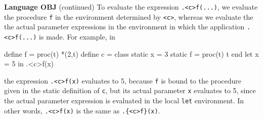 \begin{minipage}[t]{\sw}
\slidenumber
\LARGE
{\bf Language OBJ} (continued)\exx
To evaluate the expression \verb'.<c>f(...)',
we evaluate the procedure \verb'f'
in the environment determined by \verb'<c>',
whereas we evaluate the the actual parameter expressions
in the environment in which the application \verb'.<c>f(...)' is made.
For example, in
\begin{qv}
define f = proc(t) *(2,t)
define c =
  class
    static x = 3
    static f = proc(t) t
  end
let
  x = 5
in
  .<c>f(x)
\end{qv}
the expression \verb'.<c>f(x)' evaluates to 5,
because \verb'f' is bound to the procedure given
in the static definition of \verb'c',
but its actual parameter \verb'x' evaluates to 5,
since the actual parameter expression is evaluated
in the local \verb'let' environment.
In other words, \verb'.<c>f(x)' is the same
as \verb'.{<c>f}(x)'.
\end{minipage}
